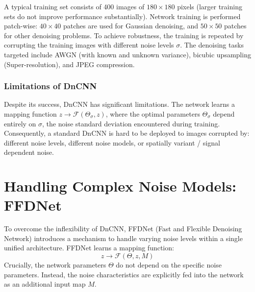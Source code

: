 A typical training set consists of 400 images of $180 \times 180$ pixels (larger training sets do not improve performance substantially). Network training is performed patch-wise: $40 \times 40$ patches are used for Gaussian denoising, and $50 \times 50$ patches for other denoising problems. To achieve robustness, the training is repeated by corrupting the training images with different noise levels $\sigma$. The denoising tasks targeted include AWGN (with known and unknown variance), bicubic upsampling (Super-resolution), and JPEG compression.

\subsubsection{Limitations of DnCNN}
Despite its success, DnCNN has significant limitations. The network learns a mapping function $z \to \mathcal{F}(\Theta_\sigma, z)$, where the optimal parameters $\Theta_\sigma$ depend entirely on $\sigma$, the noise standard deviation encountered during training. Consequently, a standard DnCNN is hard to be deployed to images corrupted by: different noise levels, different noise models, or spatially variant / signal dependent noise.

\section{Handling Complex Noise Models: FFDNet}
To overcome the inflexibility of DnCNN, FFDNet (Fast and Flexible Denoising Network) introduces a mechanism to handle varying noise levels within a single unified architecture. FFDNet learns a mapping function:
\begin{equation}
    z \to \mathcal{F}(\Theta, z, M)
\end{equation}
Crucially, the network parameters $\Theta$ do not depend on the specific noise parameters. Instead, the noise characteristics are explicitly fed into the network as an additional input map $M$.

